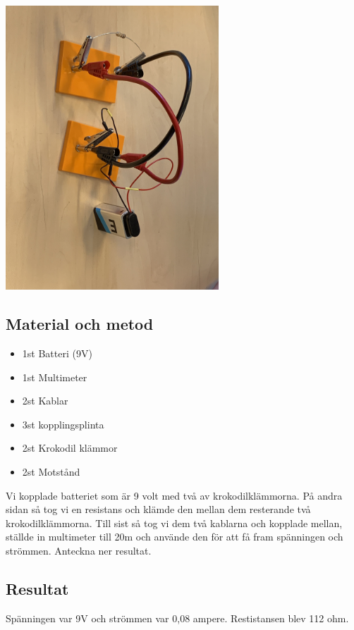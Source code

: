 \documentclass[11pt]{article}
\begin{document}
    \includegraphics[width=0.6\textwidth]{../del1.jpg}

    \subsection{Material och metod}

    \begin{itemize}
        \item 1st Batteri (9V)
        \item 1st Multimeter
        \item 2st Kablar
        \item 3st kopplingsplinta
        \item 2st Krokodil klämmor
        \item 2st Motstånd
    \end{itemize}

    Vi kopplade batteriet som är 9 volt med två av krokodilklämmorna.
    På andra sidan så tog vi en resistans och klämde den mellan dem resterande två krokodilklämmorna.
    Till sist så tog vi dem två kablarna och kopplade mellan, ställde in multimeter till 20m och använde den för att få fram spänningen och strömmen.
    Anteckna ner resultat.


    \subsection{Resultat}
    Spänningen var 9V och strömmen var 0,08 ampere.
    Restistansen blev 112 ohm.
\end{document}

